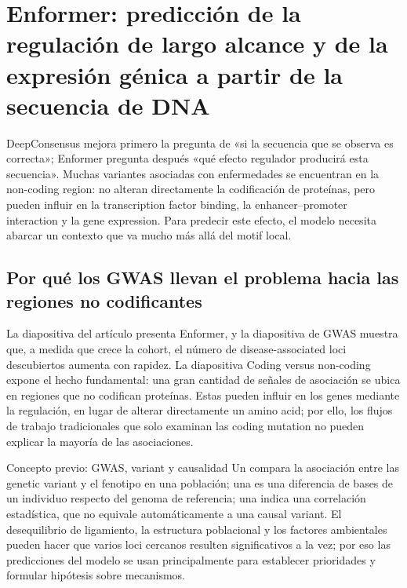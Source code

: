\section{Enformer: predicción de la regulación de largo alcance y de la expresión génica a partir de la secuencia de DNA}

DeepConsensus mejora primero la pregunta de «si la secuencia que se observa es correcta»; Enformer pregunta después «qué efecto regulador producirá esta secuencia». Muchas variantes asociadas con enfermedades se encuentran en la non-coding region: no alteran directamente la codificación de proteínas, pero pueden influir en la transcription factor binding, la enhancer--promoter interaction y la gene expression. Para predecir este efecto, el modelo necesita abarcar un contexto que va mucho más allá del motif local.

\subsection{Por qué los GWAS llevan el problema hacia las regiones no codificantes}

La diapositiva del artículo presenta Enformer, y la diapositiva de GWAS muestra que, a medida que crece la cohort, el número de disease-associated loci descubiertos aumenta con rapidez. La diapositiva Coding versus non-coding expone el hecho fundamental: una gran cantidad de señales de asociación se ubica en regiones que no codifican proteínas. Estas pueden influir en los genes mediante la regulación, en lugar de alterar directamente un amino acid; por ello, los flujos de trabajo tradicionales que solo examinan las coding mutation no pueden explicar la mayoría de las asociaciones.




\begin{knowledgebox}{Concepto previo: GWAS, variant y causalidad}
Un  compara la asociación entre las genetic variant y el fenotipo en una población; una  es una diferencia de bases de un individuo respecto del genoma de referencia; una  indica una correlación estadística, que no equivale automáticamente a una causal variant. El desequilibrio de ligamiento, la estructura poblacional y los factores ambientales pueden hacer que varios loci cercanos resulten significativos a la vez; por eso las predicciones del modelo se usan principalmente para establecer prioridades y formular hipótesis sobre mecanismos.
\end{knowledgebox}


